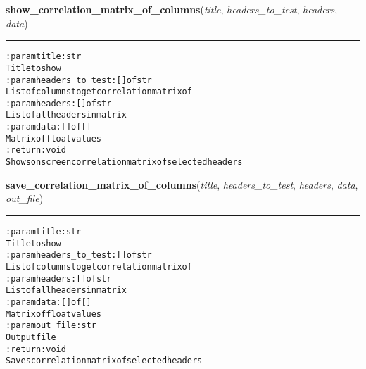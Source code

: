     \label{hal:ml:analysis:correlation:show_correlation_matrix_of_columns}

    \vspace{0.5ex}

\hspace{.8\funcindent}\begin{boxedminipage}{\funcwidth}

    \raggedright \textbf{show\_correlation\_matrix\_of\_columns}(\textit{title}, \textit{headers\_to\_test}, \textit{headers}, \textit{data})

    \vspace{-1.5ex}

    \rule{\textwidth}{0.5\fboxrule}
\setlength{\parskip}{2ex}
\begin{alltt}

:param title: str
    Title to show
:param headers\_to\_test: [] of str
    List of columns to get correlation matrix of
:param headers: [] of str
    List of all headers in matrix
:param data: [] of []
    Matrix of float values
:return: void
    Shows on screen correlation matrix of selected headers
\end{alltt}

\setlength{\parskip}{1ex}
    \end{boxedminipage}

    \label{hal:ml:analysis:correlation:save_correlation_matrix_of_columns}

    \vspace{0.5ex}

\hspace{.8\funcindent}\begin{boxedminipage}{\funcwidth}

    \raggedright \textbf{save\_correlation\_matrix\_of\_columns}(\textit{title}, \textit{headers\_to\_test}, \textit{headers}, \textit{data}, \textit{out\_file})

    \vspace{-1.5ex}

    \rule{\textwidth}{0.5\fboxrule}
\setlength{\parskip}{2ex}
\begin{alltt}

:param title: str
    Title to show
:param headers\_to\_test: [] of str
    List of columns to get correlation matrix of
:param headers: [] of str
    List of all headers in matrix
:param data: [] of []
    Matrix of float values
:param out\_file: str
    Output file
:return: void
    Saves correlation matrix of selected headers
\end{alltt}

\setlength{\parskip}{1ex}
    \end{boxedminipage}

